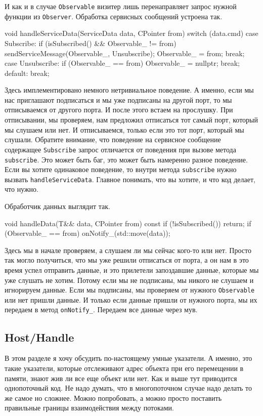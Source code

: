 И как и в случае \verb"Observable" визитер лишь перенаправляет запрос нужной функции из \verb"Observer".
Обработка сервисных сообщений устроена так.
\begin{cppcode}
void handleServiceData(ServiceData data, CPointer from) {
  switch (data.cmd) {
  case Subscribe:
    if (isSubscribed() && Observable_ != from)
      sendServiceMessage(Observable_, {Unsubscribe});
    Observable_ = from;
    break;
  case Unsubscribe:
    if (Observable_ == from)
      Observable_ = nullptr;
    break;
  default:
    break;
  }
}
\end{cppcode}
Здесь имплементировано немного нетривиальное поведение.
А именно, если мы нас приглашают подписаться и мы уже подписаны на другой порт, то мы отписываемся от другого порта.
И после этого встаем на прослушку.
При отписывании, мы проверяем, нам предложил отписаться тот самый порт, который мы слушаем или нет.
И отписываемся, только если это тот порт, который мы слушали.
Обратите внимание, что поведение на сервисное сообщение содержащее \verb"Subscribe" запрос отличается от поведения при вызове метода \verb"subscribe".
Это может быть баг, это может быть намеренно разное поведение.
Если вы хотите одинаковое поведение, то внутри метода \verb"subscribe" нужно вызвать \verb"handleServiceData".
Главное понимать, что вы хотите, и что код делает, что нужно.

Обработчик данных выглядит так.
\begin{cppcode}
void handleData(T&& data, CPointer from) const {
  if (!isSubscribed())
    return;
  if (Observable_ == from)
    onNotify_(std::move(data));
}
\end{cppcode}
Здесь мы в начале проверяем, а слушаем ли мы сейчас кого-то или нет.
Просто так могло получиться, что мы уже решили отписаться от порта, а он нам в это время успел отправить данные, и это прилетели запоздавшие данные, которые мы уже слушать не хотим.
Потому если мы не подписаны, мы никого не слушаем и игнорируем данные.
Если мы подписаны, мы проверяем от нужного \verb"Observable" или нет пришли данные.
И только если данные пришли от нужного порта, мы их передаем в метод \verb"onNotify_".
Передаем все данные через мув.

\subsection{Host/Handle}
\label{section::TrackingPtr}

В этом разделе я хочу обсудить по-настоящему умные указатели.
А именно, это такие указатели, которые отслеживают адрес объекта при его перемещении в памяти, знают жив ли все еще объект или нет.
Как и выше тут приводится однопоточный код.
Не надо думать, что в многопоточном случае надо делать то же самое но сложнее.
Можно попробовать, а можно просто поставить правильные границы взаимодействия между потоками.

